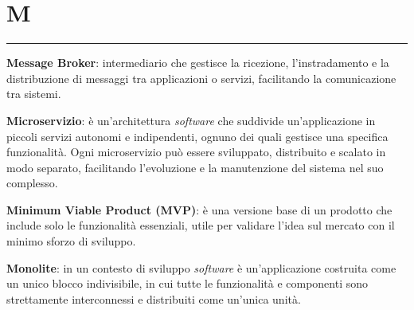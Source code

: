 \section*{M}
{\color{lightgray}\rule{\textwidth}{0.4pt}} %
\begin{glossaryitemize}
    \item \textbf{Message Broker}: intermediario che gestisce la ricezione, l'instradamento e la distribuzione di messaggi tra applicazioni o servizi, facilitando la comunicazione tra sistemi.
    \item \textbf{Microservizio}: è un'architettura \textit{software} che suddivide un'applicazione in piccoli servizi autonomi e indipendenti, ognuno dei quali gestisce una specifica funzionalità. Ogni microservizio può essere sviluppato, distribuito e scalato in modo separato, facilitando l'evoluzione e la manutenzione del sistema nel suo complesso.
    \item \textbf{Minimum Viable Product (MVP)}: è una versione base di un prodotto che include solo le funzionalità essenziali, utile per validare l'idea sul mercato con il minimo sforzo di sviluppo.
    \item \textbf{Monolite}: in un contesto di sviluppo \textit{software} è un'applicazione costruita come un unico blocco indivisibile, in cui tutte le funzionalità e componenti sono strettamente interconnessi e distribuiti come un'unica unità.
\end{glossaryitemize}

